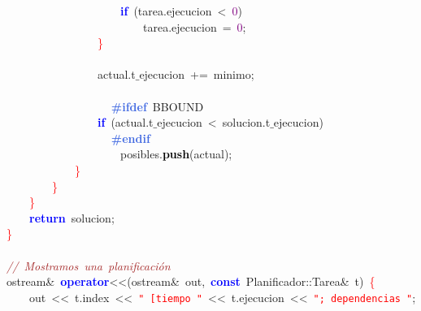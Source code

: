 \mbox{}\ \ \ \ \ \ \ \ \ \ \ \ \ \ \ \ \ \ \ \ \textbf{\textcolor{Blue}{if}}\ \textcolor{BrickRed}{(}tarea\textcolor{BrickRed}{.}ejecucion\ \textcolor{BrickRed}{\textless{}}\ \textcolor{Purple}{0}\textcolor{BrickRed}{)} \\
\mbox{}\ \ \ \ \ \ \ \ \ \ \ \ \ \ \ \ \ \ \ \ \ \ \ \ tarea\textcolor{BrickRed}{.}ejecucion\ \textcolor{BrickRed}{=}\ \textcolor{Purple}{0}\textcolor{BrickRed}{;} \\
\mbox{}\ \ \ \ \ \ \ \ \ \ \ \ \ \ \ \ \textcolor{Red}{\}} \\
\mbox{} \\
\mbox{}\ \ \ \ \ \ \ \ \ \ \ \ \ \ \ \ actual\textcolor{BrickRed}{.}t$\_$ejecucion\ \textcolor{BrickRed}{+=}\ minimo\textcolor{BrickRed}{;} \\
\mbox{} \\
\mbox{}\textbf{\textcolor{RoyalBlue}{\ \ \ \ \ \ \ \ \ \ \ \ \ \ \ \ \#ifdef}}\ BBOUND \\
\mbox{}\ \ \ \ \ \ \ \ \ \ \ \ \ \ \ \ \textbf{\textcolor{Blue}{if}}\ \textcolor{BrickRed}{(}actual\textcolor{BrickRed}{.}t$\_$ejecucion\ \textcolor{BrickRed}{\textless{}}\ solucion\textcolor{BrickRed}{.}t$\_$ejecucion\textcolor{BrickRed}{)} \\
\mbox{}\textbf{\textcolor{RoyalBlue}{\ \ \ \ \ \ \ \ \ \ \ \ \ \ \ \ \#endif}} \\
\mbox{}\ \ \ \ \ \ \ \ \ \ \ \ \ \ \ \ \ \ \ \ posibles\textcolor{BrickRed}{.}\textbf{\textcolor{Black}{push}}\textcolor{BrickRed}{(}actual\textcolor{BrickRed}{);} \\
\mbox{}\ \ \ \ \ \ \ \ \ \ \ \ \textcolor{Red}{\}} \\
\mbox{}\ \ \ \ \ \ \ \ \textcolor{Red}{\}} \\
\mbox{}\ \ \ \ \textcolor{Red}{\}} \\
\mbox{}\ \ \ \ \textbf{\textcolor{Blue}{return}}\ solucion\textcolor{BrickRed}{;} \\
\mbox{}\textcolor{Red}{\}} \\
\mbox{} \\
\mbox{}\textit{\textcolor{Brown}{//\ Mostramos\ una\ planificación}} \\
\mbox{}ostream\textcolor{BrickRed}{\&}\ \textbf{\textcolor{Blue}{operator}}\textcolor{BrickRed}{\textless{}\textless{}(}ostream\textcolor{BrickRed}{\&}\ out\textcolor{BrickRed}{,}\ \textbf{\textcolor{Blue}{const}}\ Planificador\textcolor{BrickRed}{::}Tarea\textcolor{BrickRed}{\&}\ t\textcolor{BrickRed}{)}\ \textcolor{Red}{\{} \\
\mbox{}\ \ \ \ out\ \textcolor{BrickRed}{\textless{}\textless{}}\ t\textcolor{BrickRed}{.}index\ \textcolor{BrickRed}{\textless{}\textless{}}\ \texttt{\textcolor{Red}{"{}\ [tiempo\ "{}}}\ \textcolor{BrickRed}{\textless{}\textless{}}\ t\textcolor{BrickRed}{.}ejecucion\ \textcolor{BrickRed}{\textless{}\textless{}}\ \texttt{\textcolor{Red}{"{};\ dependencias\ "{}}}\textcolor{BrickRed}{;} \\
